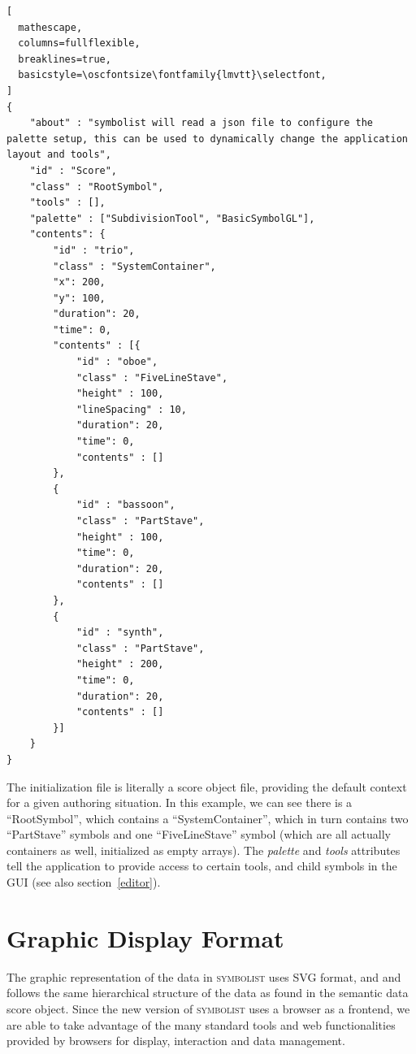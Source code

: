 \documentclass{article}
\def\symbolist{\textsc{symbolist}\xspace}
\def\oscfontsize{\footnotesize}
\begin{document}
\begin{lstlisting}[
  mathescape,
  columns=fullflexible,
  breaklines=true,
  basicstyle=\oscfontsize\fontfamily{lmvtt}\selectfont,
]
{
    "about" : "symbolist will read a json file to configure the palette setup, this can be used to dynamically change the application layout and tools",
    "id" : "Score",
    "class" : "RootSymbol",
    "tools" : [],
    "palette" : ["SubdivisionTool", "BasicSymbolGL"],
    "contents": { 
        "id" : "trio",
        "class" : "SystemContainer",
        "x": 200,
        "y": 100,
        "duration": 20,
        "time": 0,
        "contents" : [{
            "id" : "oboe",
            "class" : "FiveLineStave",
            "height" : 100,
            "lineSpacing" : 10,
            "duration": 20,
            "time": 0,
            "contents" : []
        },
        {
            "id" : "bassoon",
            "class" : "PartStave",
            "height" : 100,
            "time": 0,
            "duration": 20,
            "contents" : []
        },
        {
            "id" : "synth",
            "class" : "PartStave",
            "height" : 200,
            "time": 0,
            "duration": 20,
            "contents" : []
        }]
    }
}
\end{lstlisting}

The initialization file is literally a score object file, providing the default context for a given authoring situation. In this example, we can see there is a ``RootSymbol'', which contains a ``SystemContainer'', which in turn contains two ``PartStave'' symbols and one ``FiveLineStave'' symbol (which are all actually containers as well, initialized as empty arrays). The \textit{palette} and \textit{tools} attributes tell the application to provide access to certain tools, and child symbols in the GUI (see also section~\ref{editor}).

\section{Graphic Display Format}\label{graphic_display_format}

The graphic representation of the data in \symbolist uses SVG format, and and follows the same hierarchical structure of the data as found in the semantic data score object.
Since the new version of \symbolist uses a browser as a frontend, we are able to take advantage of the many standard tools and web functionalities provided by browsers for display, interaction and data management.
\end{document}
